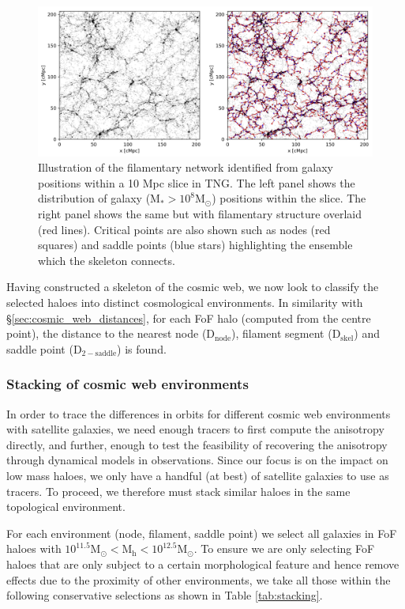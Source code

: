 \begin{figure}
	\includegraphics[width=\linewidth]{dyn_mod_files/TNG300-1-SM10-8-slice-galaxy-density-skeleton-comparison.png}
    \caption{Illustration of the filamentary network identified from galaxy positions within a 10 Mpc slice in TNG. The left panel shows the distribution of galaxy ($\mathrm{M_{\ast} > 10^{8}M_{\odot}}$) positions within the slice. The right panel shows the same but with filamentary structure overlaid (red lines). Critical points are also shown such as nodes (red squares) and saddle points (blue stars) highlighting the ensemble which the skeleton connects.}
    \label{fig:disperse_TNG300}
\end{figure}

Having constructed a skeleton of the cosmic web, we now look to classify the selected haloes into distinct cosmological environments. In similarity with \S\ref{sec:cosmic_web_distances}, for each FoF halo (computed from the centre point), the distance to the nearest node ($\mathrm{D_{node}}$), filament segment ($\mathrm{D_{skel}}$) and saddle point ($\mathrm{D_{2-saddle}}$) is found. 

\subsubsection{Stacking of cosmic web environments} \label{sec:stacking}
In order to trace the differences in orbits for different cosmic web environments with satellite galaxies, we need enough tracers to first compute the anisotropy directly, and further, enough to test the feasibility of recovering the anisotropy through dynamical models in observations. Since our focus is on the impact on low mass haloes, we only have a handful (at best) of satellite galaxies to use as tracers. To proceed, we therefore must stack similar haloes in the same topological environment. 

For each environment (node, filament, saddle point) we select all galaxies in FoF haloes with $\mathrm{10^{11.5} M_{\odot} < M_{h} < 10^{12.5} M_{\odot}}$. To ensure we are only selecting FoF haloes that are only subject to a certain morphological feature and hence remove effects due to the proximity of other environments, we take all those within the following conservative selections as shown in Table \ref{tab:stacking}. 


